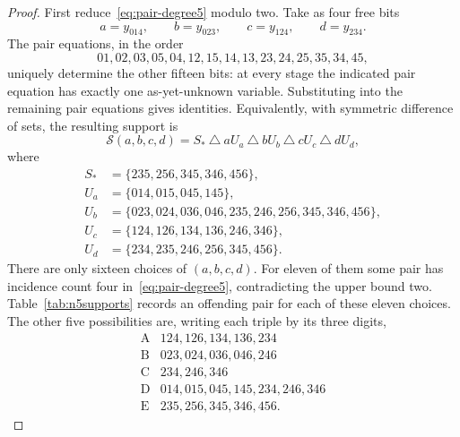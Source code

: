 \documentclass[11pt,a4paper]{article}
\theoremstyle{remark}
\begin{document}
\begin{proof}
First reduce~\eqref{eq:pair-degree5} modulo two.  Take as four free
bits
\[
 a=y_{014},\qquad b=y_{023},\qquad c=y_{124},\qquad d=y_{234}.
\]
The pair equations, in the order
\[
 01,02,03,05,04,12,15,14,13,23,24,25,35,34,45,
\]
uniquely determine the other fifteen bits: at every stage the
indicated pair equation has exactly one as-yet-unknown variable.
Substituting into the remaining pair equations gives identities.
Equivalently, with symmetric difference of sets, the resulting
support is
\begin{equation}\label{eq:four-free5}
 \mathcal S(a,b,c,d)
 =S_*\ \triangle\ aU_a\ \triangle\ bU_b\ \triangle\ cU_c\ \triangle\ dU_d,
\end{equation}
where
\begin{align*}
 S_*&=\{235,256,345,346,456\},\\
 U_a&=\{014,015,045,145\},\\
 U_b&=\{023,024,036,046,235,246,256,345,346,456\},\\
 U_c&=\{124,126,134,136,246,346\},\\
 U_d&=\{234,235,246,256,345,456\}.
\end{align*}
There are only sixteen choices of $(a,b,c,d)$.  For eleven of them
some pair has incidence count four in~\eqref{eq:pair-degree5},
contradicting the upper bound two.  Table~\ref{tab:n5supports}
records an offending pair for each of these eleven choices.
The other five possibilities are, writing each triple by its three
digits,
\[
\begin{array}{c|l}
 \mathrm A&124,126,134,136,234\\
 \mathrm B&023,024,036,046,246\\
 \mathrm C&234,246,346\\
 \mathrm D&014,015,045,145,234,246,346\\
 \mathrm E&235,256,345,346,456.
\end{array}\tag{$\dagger$}
\]


\end{proof}
\end{document}
